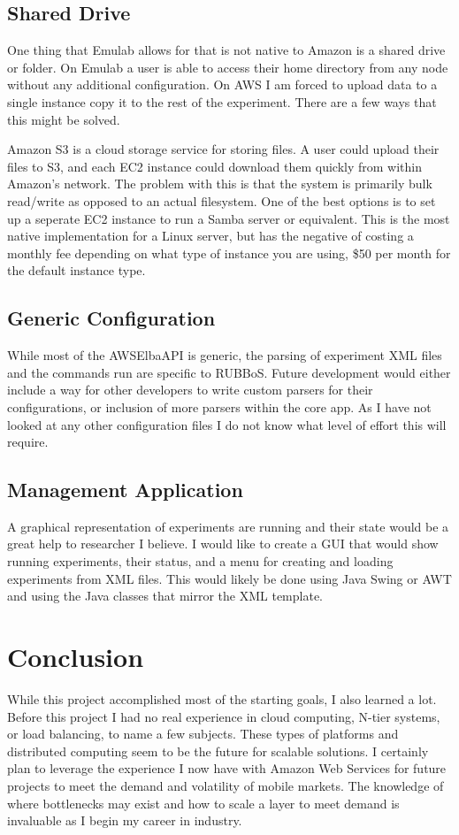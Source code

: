 \documentclass{article}
\begin{document}
\subsection{Shared Drive}
One thing that Emulab allows for that is not native to Amazon is a shared drive or folder. On Emulab a user is able to access their home directory from any node without any additional configuration. On AWS I am forced to upload data to a single instance copy it to the rest of the experiment. There are a few ways that this might be solved.

Amazon S3 is a cloud storage service for storing files. A user could upload their files to S3, and each EC2 instance could download them quickly from within Amazon's network. The problem with this is that the system is primarily bulk read/write as opposed to an actual filesystem. One of the best options is to set up a seperate EC2 instance to run a Samba server or equivalent. This is the most native implementation for a Linux server, but has the negative of costing a monthly fee depending on what type of instance you are using, \$50 per month for the default instance type.
\subsection{Generic Configuration}
While most of the AWSElbaAPI is generic, the parsing of experiment XML files and the commands run are specific to RUBBoS. Future development would either include a way for other developers to write custom parsers for their configurations, or inclusion of more parsers within the core app. As I have not looked at any other configuration files I do not know what level of effort this will require.
\subsection{Management Application}
A graphical representation of experiments are running and their state would be a great help to researcher I believe. I would like to create a GUI that would show running experiments, their status, and a menu for creating and loading experiments from XML files. This would likely be done using Java Swing or AWT and using the Java classes that mirror the XML template.
\section{Conclusion}
While this project accomplished most of the starting goals, I also learned a lot. Before this project I had no real experience in cloud computing, N-tier systems, or load balancing, to name a few subjects. These types of platforms and distributed computing seem to be the future for scalable solutions. I certainly plan to leverage the experience I now have with Amazon Web Services for future projects to meet the demand and volatility of mobile markets. The knowledge of where bottlenecks may exist and how to scale a layer to meet demand is invaluable as I begin my career in industry.



\end{document}
